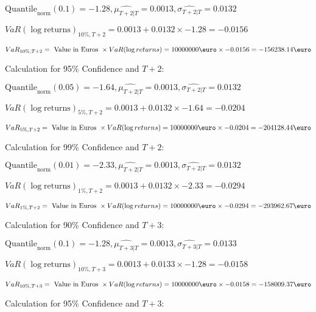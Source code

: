 \indent\indent $\text{Quantile}_\text{norm}(0.1) = -1.28,\hat{\mu_{T+2|T}} = 0.0013, \hat{\sigma_{T+2|T}} = 0.0132$

\indent\indent $VaR(\log \text{returns})_{10\%, T + 2} = 0.0013 + 0.0132\times-1.28 = -0.0156$

\indent\indent $VaR_{10\%, T + 2} = \text{ Value in Euros } \times VaR(\log returns) = 10 000 000 \text{\euro} \times-0.0156 = -156238.14 \text{\euro}$\newline




Calculation for 95\% Confidence and $T+2$:

\indent\indent $\text{Quantile}_\text{norm}(0.05) = -1.64,\hat{\mu_{T+2|T}} = 0.0013, \hat{\sigma_{T+2|T}} = 0.0132$

\indent\indent $VaR(\log \text{returns})_{5\%, T + 2} = 0.0013 + 0.0132\times-1.64 = -0.0204$

\indent\indent $VaR_{5\%, T + 2} = \text{ Value in Euros } \times VaR(\log returns) = 10 000 000 \text{\euro} \times-0.0204 = -204128.44 \text{\euro}$\newline




Calculation for 99\% Confidence and $T+2$:

\indent\indent $\text{Quantile}_\text{norm}(0.01) = -2.33,\hat{\mu_{T+2|T}} = 0.0013, \hat{\sigma_{T+2|T}} = 0.0132$

\indent\indent $VaR(\log \text{returns})_{1\%, T + 2} = 0.0013 + 0.0132\times-2.33 = -0.0294$

\indent\indent $VaR_{1\%, T + 2} = \text{ Value in Euros } \times VaR(\log returns) = 10 000 000 \text{\euro} \times-0.0294 = -293962.67 \text{\euro}$\newline




Calculation for 90\% Confidence and $T+3$:

\indent\indent $\text{Quantile}_\text{norm}(0.1) = -1.28,\hat{\mu_{T+3|T}} = 0.0013, \hat{\sigma_{T+3|T}} = 0.0133$

\indent\indent $VaR(\log \text{returns})_{10\%, T + 3} = 0.0013 + 0.0133\times-1.28 = -0.0158$

\indent\indent $VaR_{10\%, T + 3} = \text{ Value in Euros } \times VaR(\log returns) = 10 000 000 \text{\euro} \times-0.0158 = -158009.37 \text{\euro}$\newline




Calculation for 95\% Confidence and $T+3$:

